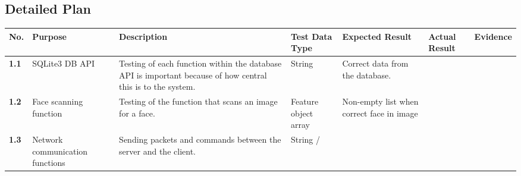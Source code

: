 \documentclass[12pt,a4paper]{report}
\begin{document}
\bigskip

\subsection[Detailed Plan]{Detailed Plan}

\begin{longtable}{|l|m{2.375cm}|m{2.682cm}|m{1.416cm}|m{2.238cm}|m{1.181cm}|m{1.8369999cm}|}
\hline
\bfseries No. &
\bfseries Purpose &
\bfseries Description &
\bfseries Test Data Type &
\bfseries Expected Result &
\bfseries Actual Result &
\bfseries Evidence \\\hline
\bfseries 1.1 &
SQLite3 DB API &
Testing of each function within the database API is important because of how central this is to the system. &
String &
Correct data from the database. &
~
 &
~
\\\hline
\bfseries 1.2 &
Face scanning function &
Testing of the function that scans an image for a face. &
Feature object array &
Non-empty list when correct face in image &
~
 &
~
\\\hline
\bfseries 1.3 &
Network communication functions &
Sending packets and commands between the server and the client. &
String /


\end{longtable}
\end{document}
